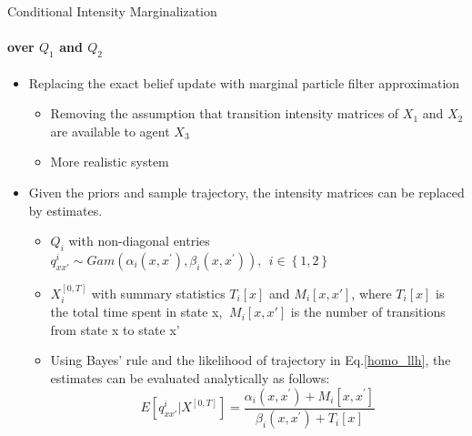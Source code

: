\documentclass[
	english,%
	aspectratio=169,%
	color={accentcolor=3b},
	logo=true,%
	colorframetitle=false,%
	]{tudabeamer}
\begin{document}
\begin{frame}{Conditional Intensity Marginalization}
\framesubtitle{over $ Q_{1} $ and $ Q_{2} $}
\begin{itemize}
	\item Replacing the exact belief update with marginal particle filter approximation
	\begin{itemize}
		\item Removing the assumption that transition intensity matrices of $ X_{1} $ and $ X_{2} $ are available to agent $ X_{3} $
		\item More realistic system
	\end{itemize}
	\item Given the priors and sample trajectory, the intensity matrices can be replaced by estimates. \cite{Studer2016}
	\begin{itemize}
		\item $Q_{i}$ with non-diagonal entries $ q^{i}_{xx'}\sim Gam(\alpha_{i}\left(x, x^{\prime}\right), \beta_{i}\left(x, x^{\prime}\right)),\ \ i \in \left\lbrace 1,2\right\rbrace $
		\item $X_{i}^{[0,T]}$ with summary statistics $ T_{i}[x] $ and $ M_{i}[x,x'] $, where $ T_{i}[x] $ is the total time spent in state x, $\ M_{i}[x,x'] $ is the number of transitions from state x to state x'
		\item Using Bayes' rule and the likelihood of trajectory in Eq.\ref{homo_llh}, the estimates can be evaluated analytically as follows:
		\begin{equation}
		E\left[ q^{i}_{xx'} | X^{[0,T]}\right]=\frac{\alpha_{i}\left(x, x^{\prime}\right)+M_{i}\left[x, x^{\prime}\right]}{\beta_{i}\left(x, x^{\prime}\right)+T_{i}[x]}
		\end{equation}
	\end{itemize}
\end{itemize}
\end{frame}
\end{document}
